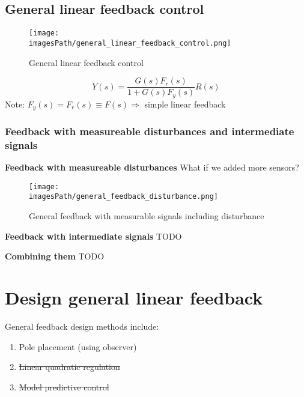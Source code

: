 \subsection{General linear feedback control}
\begin{figure}[!h]
    \centering
    \texttt{[image: \\imagesPath/general\_linear\_feedback\_control.png]}
    \caption{General linear feedback control}
    \label{fig:general_linear_feedback_control}
\end{figure}

\begin{equation*}
    Y(s) = \frac{G(s)F_r(s)}{1+G(s)F_y(s)}R(s)
\end{equation*}
Note: $F_y(s) = F_r(s) \equiv F(s) \Rightarrow$ simple linear feedback

\subsubsection{Feedback with measureable disturbances and intermediate signals}
\textbf{Feedback with measureable disturbances}
What if we added more sensors?
\begin{figure}[!h]
    \centering
    \texttt{[image: \\imagesPath/general\_feedback\_disturbance.png]}
    \caption{General feedback with measurable signals including disturbance}
    \label{fig:general_feedback_disturbance}
\end{figure}

\textbf{Feedback with intermediate signals}
TODO

\textbf{Combining them}
TODO


\section{Design general linear feedback}
General feedback design methods include:
\begin{enumerate}
    \item Pole placement (using observer)
    \item \sout{Linear quadratic regulation}
    \item \sout{Model predictive control}
\end{enumerate}

